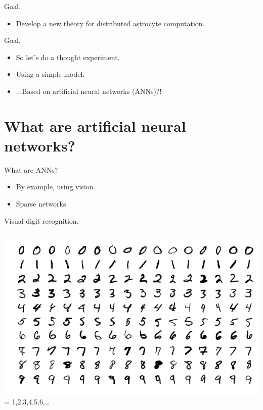 \documentclass[10pt]{beamer}
\begin{document}
\begin{frame}[fragile]{Goal.}
\begin{itemize}
    \item \alert{Develop a new theory for distributed astrocyte computation.}
\end{itemize}
\end{frame}

\begin{frame}[fragile]{Goal.}
\begin{itemize}
    \item So let's do a thought experiment. 
    \item Using a simple model. 
    \item ...Based on artificial neural networks (ANNs)?!
\end{itemize}
\end{frame}

\section[ANNs]{What are artificial neural networks?}
\begin{frame}[fragile]{What are ANNs?}
\begin{itemize}
\item By example, using vision.
\item Sparse networks.
\end{itemize}
\end{frame}

\begin{frame}[fragile]{Visual digit recognition.}
\begin{columns}
\centering
\includegraphics[scale=0.25]{images/minst.png}
\centering
 = 1,2,3,4,5,6,\ldots
\end{columns}
\end{frame}
\end{document}
